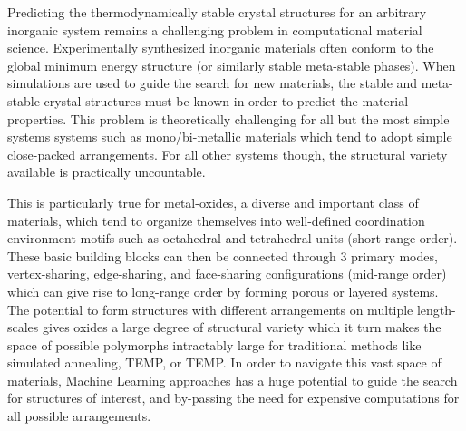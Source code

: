 

Predicting the thermodynamically stable crystal structures for an arbitrary inorganic system remains a challenging problem in computational material science.
%
Experimentally synthesized inorganic materials often conform to the global minimum energy structure (or similarly stable meta-stable phases). When simulations are used to guide the search  for new materials, the stable and meta-stable crystal structures must be known in order to predict the material properties.
%
This problem is theoretically challenging for all but the most simple systems systems such as mono/bi-metallic materials which tend to adopt simple close-packed arrangements.
%
For all other systems though, the structural variety available is practically uncountable.


This is particularly true for metal-oxides, a diverse and important class of materials, which tend to organize themselves into well-defined coordination environment motifs such as octahedral and tetrahedral units (short-range order).
%
These basic building blocks can then be connected through 3 primary modes, vertex-sharing, edge-sharing, and face-sharing configurations (mid-range order) which can give rise to long-range order by forming porous or layered systems.
The potential to form structures with different arrangements on multiple length-scales gives oxides a large degree of structural variety which it turn makes the space of possible polymorphs intractably large for traditional methods like simulated annealing, TEMP, or TEMP.
In order to navigate this vast space of materials, Machine Learning approaches has a huge potential to guide the search for structures of interest, and by-passing the need for expensive computations for all possible arrangements. 

